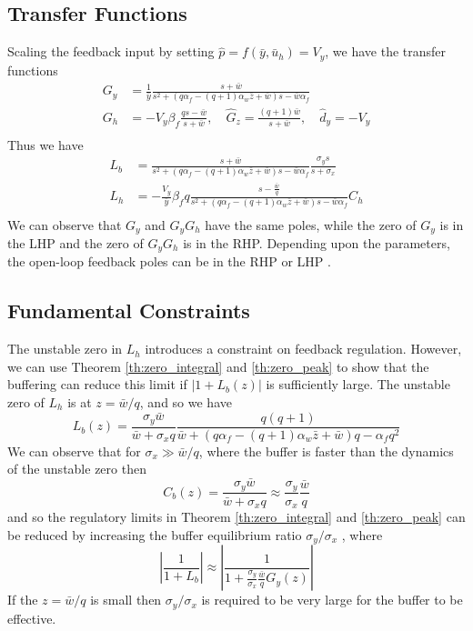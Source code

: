 \documentclass[letterpaper, 10 pt,  conference]{ieeeconf}  %
\begin{document}
\subsection{Transfer Functions}
Scaling the feedback input by setting $\hat p=f(\bar y,\bar{u}_h)=V_y$, we have the transfer functions
\begin{equation*}
\begin{aligned}
G_y&=\frac{1}{\bar{y}}\frac{s+\bar{w}}{s^2+(q\alpha_f-(q+1)\alpha_w\bar{z}+\bar{w})s-\bar{w}\alpha_f}\\
G_h&=-V_y\beta_f\frac{qs-\bar{w}}{s+\bar{w}},\quad \hat G_z=\frac{(q+1)\bar{w}}{s+\bar{w}},\quad \hat d_y=-V_y\\
\end{aligned}
\end{equation*}
Thus we have
\begin{equation*}
\begin{aligned}
L_b&=\frac{s+\bar{w}}{s^2+(q\alpha_f-(q+1)\alpha_w\bar{z}+\bar{w})s-\bar{w}\alpha_f}\frac{\sigma_ys}{s+\sigma_x}\\
L_h&=-\frac{V_y}{\bar{y}}\beta_fq\frac{s-\frac{\bar{w}}{q}}{s^2+(q\alpha_f-(q+1)\alpha_w\bar{z}+\bar{w})s-\bar{w}\alpha_f}C_h\\
\end{aligned}
\end{equation*}
We can observe that $G_y$ and $G_yG_h$ have the same poles, while the zero of $G_y$ is in the LHP and the zero of $G_yG_h$ is in the RHP. Depending upon the parameters, the open-loop feedback poles can be in the RHP or LHP \cite{CHABD11}.

\subsection{Fundamental Constraints}

The unstable zero in $L_h$ introduces a constraint on feedback regulation. However, we can use Theorem \ref{th:zero_integral} and \ref{th:zero_peak} to show that the buffering can reduce this limit if $|1+L_b(z)|$ is sufficiently large. The unstable zero of $L_h$ is at $z=\bar{w}/q$, and so we have
\begin{equation*}
L_b(z)=\frac{\sigma_y\bar{w}}{\bar{w}+\sigma_x q} \frac{q(q+1)}{\bar{w}+(q\alpha_f-(q+1)\alpha_w\bar{z}+\bar{w})q-\alpha_fq^2}
\end{equation*}
We can observe that for $\sigma_x\gg\bar{w}/q$, where the buffer is faster than the dynamics of the unstable zero then
\begin{equation*}
C_b(z)=\frac{\sigma_y\bar{w}}{\bar{w}+\sigma_x q}\approx\frac{\sigma_y}{\sigma_x}\frac{\bar{w}}{q}
\end{equation*}
and so the regulatory limits in Theorem \ref{th:zero_integral} and \ref{th:zero_peak} can be reduced by increasing the buffer equilibrium ratio $\sigma_y/\sigma_x$ \cite{HANAPS17}, where
\begin{equation*}
\left|\frac{1}{1+L_b}\right|\approx\left|\frac{1}{1+\frac{\sigma_y}{\sigma_x }\frac{\bar{w}}{q}G_y(z)}\right|
\end{equation*}
If the $z=\bar{w}/q$ is small then $\sigma_y/\sigma_x$ is required to be very large for the buffer to be effective.
\end{document}
